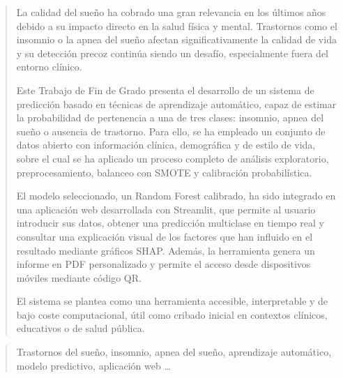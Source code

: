\documentclass[a4paper,12pt,twoside]{memoir}
\begin{document}
\renewcommand*\abstractname{Resumen}
\begin{abstract}
La calidad del sueño ha cobrado una gran relevancia en los últimos años debido a su impacto directo en la salud física y mental. Trastornos como el insomnio o la apnea del sueño afectan significativamente la calidad de vida y su detección precoz continúa siendo un desafío, especialmente fuera del entorno clínico.

Este Trabajo de Fin de Grado presenta el desarrollo de un sistema de predicción basado en técnicas de aprendizaje automático, capaz de estimar la probabilidad de pertenencia a una de tres clases: insomnio, apnea del sueño o ausencia de trastorno. Para ello, se ha empleado un conjunto de datos abierto con información clínica, demográfica y de estilo de vida, sobre el cual se ha aplicado un proceso completo de análisis exploratorio, preprocesamiento, balanceo con SMOTE y calibración probabilística.

El modelo seleccionado, un Random Forest calibrado, ha sido integrado en una aplicación web desarrollada con Streamlit, que permite al usuario introducir sus datos, obtener una predicción multiclase en tiempo real y consultar una explicación visual de los factores que han influido en el resultado mediante gráficos SHAP. Además, la herramienta genera un informe en PDF personalizado y permite el acceso desde dispositivos móviles mediante código QR.

El sistema se plantea como una herramienta accesible, interpretable y de bajo coste computacional, útil como cribado inicial en contextos clínicos, educativos o de salud pública.


\end{abstract}

\renewcommand*\abstractname{Descriptores}
\begin{abstract}
Trastornos del sueño, insomnio, apnea del sueño, aprendizaje automático, modelo predictivo, aplicación web \ldots
\end{abstract}

\clearpage
\end{document}
